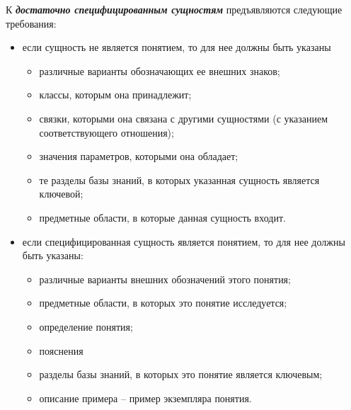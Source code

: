 К \textbf{\textit{достаточно специфицированным сущностям}} предъявляются следующие требования:
\begin{itemize}
\item если сущность не является понятием, то для нее должны быть указаны
\begin{itemize}
	\item различные варианты обозначающих ее внешних знаков;
	\item классы, которым она принадлежит;
	\item связки, которыми она связана с другими сущностями (с указанием соответствующего отношения);
	\item значения параметров, которыми она обладает;
	\item те разделы базы знаний, в которых указанная сущность является ключевой;
	\item предметные области, в которые данная сущность входит.
\end{itemize}
\item если специфицированная сущность является понятием, то для нее должны быть указаны:
\begin{itemize}
	\item различные варианты внешних обозначений этого понятия;
	\item предметные области, в которых это понятие исследуется;
	\item определение понятия;
	\item пояснения
	\item разделы базы знаний, в которых это понятие является ключевым;
	\item описание примера -- пример экземпляра понятия.
\end{itemize}
\end{itemize}



\begin{SCn}

\begin{scnsubdividing}
\end{scnsubdividing}
\end{SCn}

